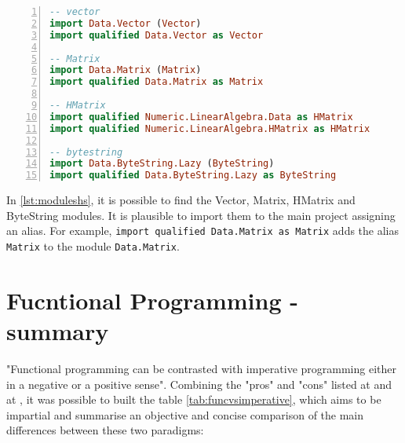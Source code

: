 \begin{lstlisting}[language=Haskell, numbers=left, caption={Modules}, captionpos=b, label={lst:moduleshs}]
-- vector
import Data.Vector (Vector)
import qualified Data.Vector as Vector

-- Matrix
import Data.Matrix (Matrix)
import qualified Data.Matrix as Matrix

-- HMatrix
import qualified Numeric.LinearAlgebra.Data as HMatrix
import qualified Numeric.LinearAlgebra.HMatrix as HMatrix

-- bytestring
import Data.ByteString.Lazy (ByteString)
import qualified Data.ByteString.Lazy as ByteString
\end{lstlisting}

In \cref{lst:moduleshs}, it is possible to find the Vector, Matrix, HMatrix and ByteString modules. It is plausible to import them to the main project assigning an alias. For example, \lstinline!import qualified Data.Matrix as Matrix! adds the alias \lstinline!Matrix! to the module \lstinline!Data.Matrix!.

\section{Fucntional Programming - summary}

"Functional programming can be contrasted with imperative programming either in a negative or a positive sense"\cite{harrison1997introduction}. Combining the "pros" and "cons" listed at \cite{harrison1997introduction} and at \cite{michaelson2011introduction}, it was possible to built the table \ref{tab:funcvsimperative}, which aims to be impartial and summarise an objective and concise comparison of the main differences between these two paradigms:

